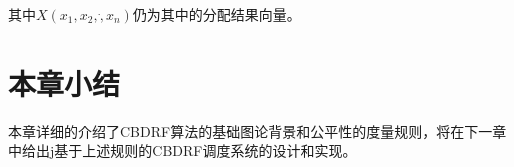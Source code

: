 其中$X({x}_{1},{x}_{2},\dot,{x}_{n})$仍为其中的分配结果向量。


\section{本章小结}
 本章详细的介绍了CBDRF算法的基础图论背景和公平性的度量规则，将在下一章中给出j基于上述规则的CBDRF调度系统的设计和实现。
